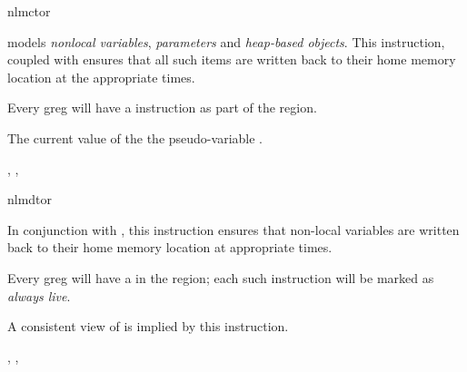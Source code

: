 \begin{instruction}{nlmctor}

  \begin{notes}
     models \emph{nonlocal variables}, \emph{\byref
      parameters} and \emph{heap-based objects}.  This instruction,
    coupled with  ensures that all
    such items are written back to their home memory location at the
    appropriate times.

    Every \ac{greg} will have a  instruction as
    part of the  region.
  \end{notes}

  \begin{results}
  \item The current value of the the pseudo-variable
    .
  \end{results}

  \noperands

  \begin{seealso}
    , ,
  \end{seealso}
\end{instruction}

\begin{instruction}{nlmdtor}

  \begin{notes}

    In conjunction with , this
    instruction ensures that non-local variables are written back to
    their home memory location at appropriate times.

    Every \ac{greg} will have a  in the
     region; each such instruction will be marked as
    \emph{always live}.

  \end{notes}

  \begin{results}
  \item A consistent view of  is implied by this
    instruction.
  \end{results}

  \noperands

  \begin{seealso}
    , ,
  \end{seealso}
\end{instruction}

